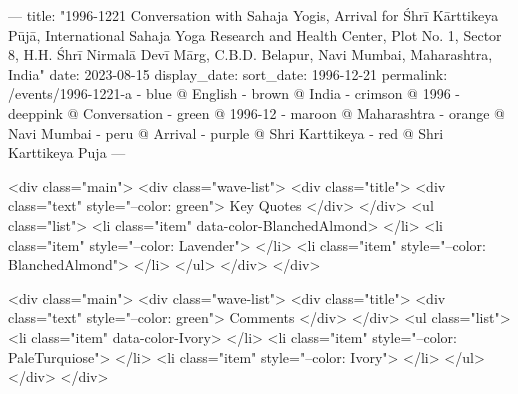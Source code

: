 ---
title: "1996-1221 Conversation with Sahaja Yogis, Arrival for Śhrī Kārttikeya Pūjā, International Sahaja Yoga Research and Health Center, Plot No. 1, Sector 8, H.H. Śhrī Nirmalā Devī Mārg, C.B.D. Belapur, Navi Mumbai, Maharashtra, India"
date: 2023-08-15
display_date: 
sort_date: 1996-12-21
permalink: /events/1996-1221-a
  - blue @ English
  - brown @ India
  - crimson @ 1996
  - deeppink @ Conversation
  - green @ 1996-12
  - maroon @ Maharashtra
  - orange @ Navi Mumbai
  - peru @ Arrival
  - purple @ Shri Karttikeya
  - red @ Shri Karttikeya Puja
---

<div class="main">
  <div class="wave-list">
    <div class="title">
      <div class="text" style="--color: green">
        Key Quotes
      </div>
    </div>
    <ul class="list">
        <li class="item" data-color-BlanchedAlmond>
        </li>
        <li class="item" style="--color: Lavender">
        </li>
        <li class="item" style="--color: BlanchedAlmond">
        </li>
      </ul>
  </div>
</div>

<div class="main">
  <div class="wave-list">
    <div class="title">
      <div class="text" style="--color: green">
        Comments
      </div>
    </div>
    <ul class="list">
        <li class="item" data-color-Ivory>
        </li>
        <li class="item" style="--color: PaleTurquiose">
        </li>
        <li class="item" style="--color: Ivory">
        </li>
      </ul>
  </div>
</div>